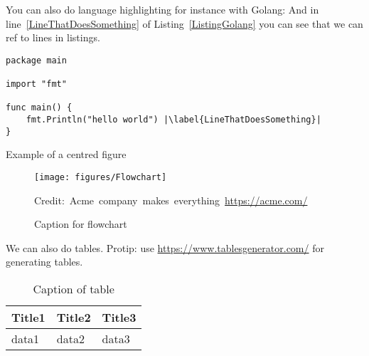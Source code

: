 
You can also do language highlighting for instance with Golang:
And in line~\ref{LineThatDoesSomething} of Listing~\ref{ListingGolang} you can see that we can ref to lines in listings.

\begin{lstlisting}[caption={Hello world in Golang},label=ListingGolang,escapechar=|]
package main

import "fmt"

func main() {
    fmt.Println("hello world") |\label{LineThatDoesSomething}|
}

\end{lstlisting}



Example of a centred figure
\begin{figure}[H]
    \centering
    \texttt{[image: figures/Flowchart]}
    \caption{Caption for flowchart}
  	\medskip 
	\hspace*{15pt}\hbox{\scriptsize Credit: Acme company makes everything \url{https://acme.com/}}
    \label{FlowchartFigure}
\end{figure}



We can also do tables. Protip: use \url{https://www.tablesgenerator.com/} for generating tables.
\begin{table}[H]
\centering
\caption{Caption of table}
\label{TableLabel}
\begin{tabular}{|l|l|l|}
\hline
Title1 & Title2 & Title3 \\ \hline
data1  & data2  & data3  \\ \hline
\end{tabular}
\end{table}

